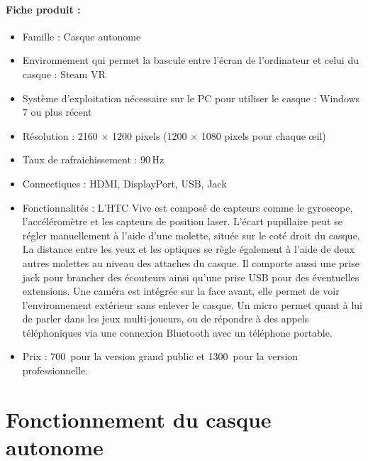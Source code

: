 \documentclass[12pt, a4paper]{report}
\newcommand{\euro}{\,\EUR}
\begin{document}
\paragraph{Fiche produit :}
\begin{itemize}
\item Famille : Casque autonome
\item Environnement qui permet la bascule entre l'écran de l'ordinateur et celui du casque : Steam VR
\item Système d'exploitation nécessaire sur le PC pour utiliser le casque : Windows 7 ou plus récent
\item Résolution : 2160 $\times$ 1200 pixels (1200 $\times$ 1080 pixels pour chaque \oe{}il)
\item Taux de rafraichissement : 90\,Hz
\item Connectiques : HDMI, DisplayPort, USB, Jack
\item Fonctionnalités : L'HTC Vive est composé de capteurs comme le gyroscope, l'accéléromètre et les capteurs de position laser.
L'écart pupillaire peut se régler manuellement à l'aide d'une molette, située sur le coté droit du casque. La distance entre les yeux et les optiques se règle également à l'aide de deux autres molettes au niveau des attaches du casque.
Il comporte aussi une prise jack pour brancher des écouteurs ainsi qu'une prise USB pour des éventuelles extensions. Une caméra est intégrée sur la face avant, elle permet de voir l'environnement extérieur sans enlever le casque. Un micro permet quant à lui de parler dans les jeux multi-joueurs, ou de répondre à des appels téléphoniques via une connexion Bluetooth avec un téléphone portable.
\item Prix : 700\euro{} pour la version grand public et 1300\euro{} pour la version professionnelle.
\end{itemize}

\section[Fontionnement de l'HTC Vive]{Fonctionnement du casque autonome}
\end{document}
